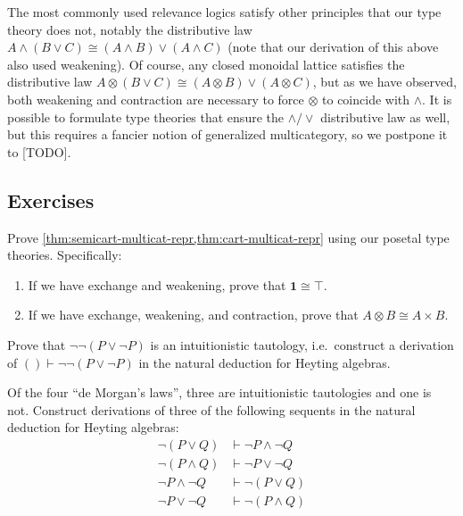 \documentclass{book}
\let\types\vdash
\let\meet\wedge
\let\join\vee
\def\one{\mathbf{1}}
\let\tensor\otimes
\begin{document}
The most commonly used relevance logics satisfy other principles that our type theory does not, notably the distributive law $A\meet (B\join C) \cong (A\meet B)\join (A\meet C)$ (note that our derivation of this above also used weakening).
Of course, any closed monoidal lattice satisfies the distributive law $A\tensor (B\join C) \cong (A\tensor B)\join (A\tensor C)$, but as we have observed, both weakening and contraction are necessary to force $\tensor$ to coincide with $\meet$.
It is possible to formulate type theories that ensure the $\meet/\join$ distributive law as well, but this requires a fancier notion of generalized multicategory, so we postpone it to [TODO].


\subsection*{Exercises}

\begin{ex}\label{ex:cart-typetheory}
  Prove \cref{thm:semicart-multicat-repr,thm:cart-multicat-repr} using our posetal type theories.
  Specifically:
  \begin{enumerate}
  \item If we have exchange and weakening, prove that $\one \cong \top$.
  \item If we have exchange, weakening, and contraction, prove that $A\tensor B \cong A\times B$.
  \end{enumerate}
\end{ex}

\begin{ex}\label{ex:nnlem}
  Prove that $\neg\neg(P\join\neg P)$ is an intuitionistic tautology, i.e.\ construct a derivation of $()\types\neg\neg(P\join\neg P)$ in the natural deduction for Heyting algebras.
\end{ex}

\begin{ex}\label{ex:demorgan}
  Of the four ``de Morgan's laws'', three are intuitionistic tautologies and one is not.
  Construct derivations of three of the following sequents in the natural deduction for Heyting algebras:
  \begin{align*}
    \neg(P\join Q) &\types \neg P \meet \neg Q\\
    \neg(P\meet Q) &\types \neg P \join \neg Q\\
    \neg P \meet \neg Q &\types \neg(P\join Q)\\
    \neg P \join \neg Q &\types \neg(P\meet Q)
  \end{align*}
\end{ex}
\end{document}
